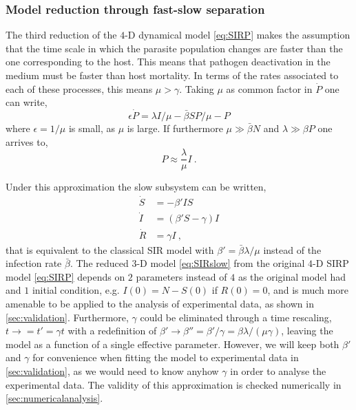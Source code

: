 \subsubsection{Model reduction through fast-slow separation}
\label{sec:fastslow}

The third
reduction of the $4$-D dynamical model \cref{eq:SIRP} makes the assumption
that
the time scale in which the parasite population changes are faster than the
one corresponding to the host. This means that pathogen deactivation in the
medium must be faster than host mortality. In terms of the rates associated to
each of these processes, this means $\mu>\gamma$. Taking $\mu$ as common factor
in $\dot{P}$ one can write,
\begin{equation}
    \epsilon \dot{P} =\lambda I/\mu-\bar{\beta}SP/\mu-P
\end{equation}
where $\epsilon=1/\mu$ is small, as $\mu$ is large. If furthermore
$\mu\gg\bar{\beta}N$ and  $\lambda\gg \beta P$ one arrives to,
\begin{equation}\label{eq:P_approx}
    P\approx \frac{\lambda}{\mu} I \ .
\end{equation}

Under this approximation the slow subsystem can be written,
\begin{equation}\label{eq:SIRslow}
    \begin{aligned}
        \dot{S} & =-\beta' I S         \\
        \dot{I} & =(\beta' S-\gamma) I \\
        \dot{R} & =\gamma I\ ,
    \end{aligned}
\end{equation}
that is equivalent to the classical SIR model with $\beta'=\bar{\beta}
    \lambda/\mu$ instead of the infection rate $\bar{\beta}$. The reduced $3$-D
model \cref{eq:SIRslow} from the original $4$-D SIRP model \cref{eq:SIRP}
depends on $2$ parameters instead of $4$ as the original model had and $1$
initial condition, e.g. $I(0)=N-S(0)$ if $R(0)=0$, and is much more amenable to
be applied to the analysis of experimental data, as shown in
\cref{sec:validation}.
Furthermore, $\gamma$ could be eliminated through a time rescaling,
$t\rightarrow=t'=\gamma t$ with a redefinition of
$\beta'\rightarrow\beta''=\beta'/\gamma=\beta\lambda/(\mu\gamma)$, leaving the
model as a function of a single effective parameter. However, we will keep both
$\beta'$ and $\gamma$ for convenience when fitting the model to experimental
data in \cref{sec:validation}, as we would need to know anyhow $\gamma$ in
order to analyse the experimental data. The validity of this approximation is
checked numerically in \cref{sec:numericalanalysis}.

